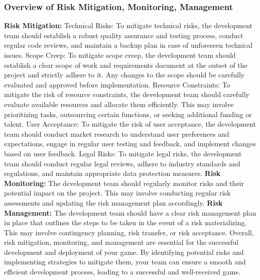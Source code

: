 \documentclass[12pt]{report}
\begin{document}
\subsubsection{Overview of Risk Mitigation, Monitoring, Management}
\justifying
\setlength{\parindent}{4em}
\setlength{\parskip}{0.5em}
\renewcommand{\baselinestretch}{1.5}

\normalsize
\textbf{Risk Mitigation:} \newline
Technical Risks: To mitigate technical risks, the development team should establish a robust quality assurance and testing process, conduct regular code reviews, and maintain a backup plan in case of unforeseen technical issues.
Scope Creep: To mitigate scope creep, the development team should establish a clear scope of work and requirements document at the outset of the project and strictly adhere to it. Any changes to the scope should be carefully evaluated and approved before implementation.
Resource Constraints: To mitigate the risk of resource constraints, the development team should carefully evaluate available resources and allocate them efficiently. This may involve prioritizing tasks, outsourcing certain functions, or seeking additional funding or talent.
User Acceptance: To mitigate the risk of user acceptance, the development team should conduct market research to understand user preferences and expectations, engage in regular user testing and feedback, and implement changes based on user feedback.
Legal Risks: To mitigate legal risks, the development team should conduct regular legal reviews, adhere to industry standards and regulations, and maintain appropriate data protection measures.\newline
\textbf{Risk Monitoring:}\newline
The development team should regularly monitor risks and their potential impact on the project. This may involve conducting regular risk assessments and updating the risk management plan accordingly.\newline
\textbf{Risk Management:}\newline
The development team should have a clear risk management plan in place that outlines the steps to be taken in the event of a risk materializing. This may involve contingency planning, risk transfer, or risk acceptance.
Overall, risk mitigation, monitoring, and management are essential for the successful development and deployment of your game. By identifying potential risks and implementing strategies to mitigate them, your team can ensure a smooth and efficient development process, leading to a successful and well-received game.
\end{document}
